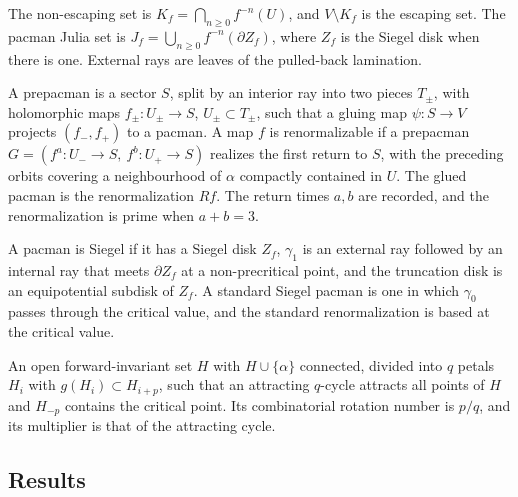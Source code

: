 \begin{definition}
\label{def:pacman-dynamics}
The non-escaping set is $K_f=\bigcap_{n\ge0}f^{-n}(U)$, and $V\setminus K_f$ is the escaping
set.  The pacman Julia set is $J_f=\bigcup_{n\ge0}f^{-n}(\partial Z_f)$, where $Z_f$ is the
Siegel disk when there is one.  External rays are leaves of the pulled-back lamination.
\end{definition}

\begin{definition}
\label{def:pacman-renorm}
A prepacman is a sector $S$, split by an interior ray into two pieces $T_\pm$, with
holomorphic maps $f_\pm\colon U_\pm\to S$, $U_\pm\subset T_\pm$, such that a gluing map
$\psi\colon S\to V$ projects $(f_-,f_+)$ to a pacman.  A map $f$ is renormalizable if a
prepacman $G=(f^a\colon U_-\to S,\ f^b\colon U_+\to S)$ realizes the first return to $S$,
with the preceding orbits covering a neighbourhood of $\alpha$ compactly contained in $U$.
The glued pacman is the renormalization $Rf$.  The return times $a,b$ are recorded, and the
renormalization is prime when $a+b=3$.
\end{definition}

\begin{definition}
\label{def:pacman-siegel}
A pacman is Siegel if it has a Siegel disk $Z_f$, $\gamma_1$ is an external ray followed by
an internal ray that meets $\partial Z_f$ at a non-precritical point, and the truncation disk
is an equipotential subdisk of $Z_f$.  A standard Siegel pacman is one in which $\gamma_0$
passes through the critical value, and the standard renormalization is based at the
critical value.
\end{definition}

\begin{definition}
\label{def:pacman-flower}
An open forward-invariant set $H$ with $H\cup\{\alpha\}$ connected, divided into $q$
petals $H_i$ with $g(H_i)\subset H_{i+p}$, such that an attracting $q$-cycle attracts all
points of $H$ and $H_{-p}$ contains the critical point.  Its combinatorial rotation number is
$p/q$, and its multiplier is that of the attracting cycle.
\end{definition}

\subsection*{Results}


